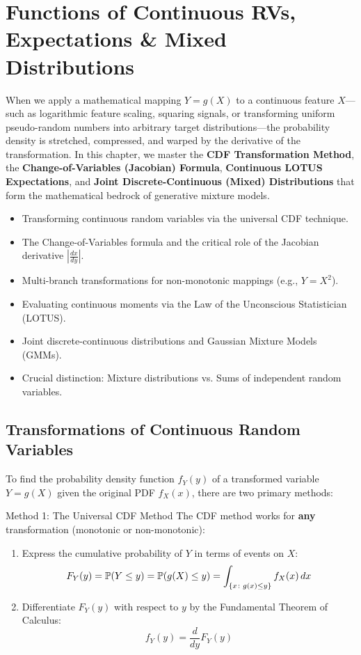 \chapter{Functions of Continuous RVs, Expectations \& Mixed Distributions}

When we apply a mathematical mapping $Y = g(X)$ to a continuous feature $X$---such as logarithmic feature scaling, squaring signals, or transforming uniform pseudo-random numbers into arbitrary target distributions---the probability density is stretched, compressed, and warped by the derivative of the transformation. In this chapter, we master the \textbf{CDF Transformation Method}, the \textbf{Change-of-Variables (Jacobian) Formula}, \textbf{Continuous LOTUS Expectations}, and \textbf{Joint Discrete-Continuous (Mixed) Distributions} that form the mathematical bedrock of generative mixture models.

\vspace{0.5cm}
\begin{tcolorbox}[colback=primarylight, colframe=primarydark, title={\textbf{What You'll Learn in this Chapter}}]
\begin{itemize}
    \item Transforming continuous random variables via the universal CDF technique.
    \item The Change-of-Variables formula and the critical role of the Jacobian derivative $\left|\frac{dx}{dy}\right|$.
    \item Multi-branch transformations for non-monotonic mappings (e.g., $Y = X^2$).
    \item Evaluating continuous moments via the Law of the Unconscious Statistician (LOTUS).
    \item Joint discrete-continuous distributions and Gaussian Mixture Models (GMMs).
    \item Crucial distinction: Mixture distributions vs. Sums of independent random variables.
\end{itemize}
\end{tcolorbox}

\section{Transformations of Continuous Random Variables}

To find the probability density function $f_Y(y)$ of a transformed variable $Y = g(X)$ given the original PDF $f_X(x)$, there are two primary methods:

\begin{formulabox}{Method 1: The Universal CDF Method}
The CDF method works for \textbf{any} transformation (monotonic or non-monotonic):
\begin{enumerate}
    \item Express the cumulative probability of $Y$ in terms of events on $X$:
    $$F_Y(y) = \P(Y \le y) = \P(g(X) \le y) = \int_{\{x \colon g(x) \le y\}} f_X(x) \, dx$$
    \item Differentiate $F_Y(y)$ with respect to $y$ by the Fundamental Theorem of Calculus:
    $$f_Y(y) = \frac{d}{dy} F_Y(y)$$
\end{enumerate}
\end{formulabox}


